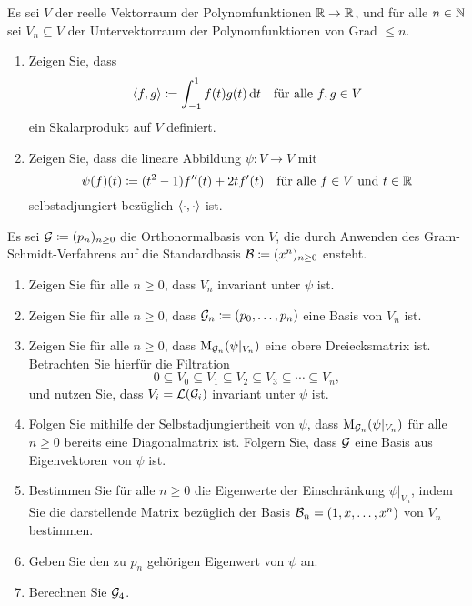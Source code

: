 \documentclass[a4paper,10pt]{scrartcl}
\begin{document}
\begin{question}
  Es sei $V$ der reelle Vektorraum der Polynomfunktionen $\mathbb{R} \to \mathbb{R}$, und für alle $n \in \mathbb{N}$ sei $V_n \subseteq V$ der Untervektorraum der Polynomfunktionen von Grad $\leq n$.
  \begin{enumerate}[leftmargin=*]
    \item
      
      Zeigen Sie, dass
      \[
                  \langle f, g \rangle
        \coloneqq \int_{-1}^1 f(t) g(t) \,\text{d}t
        \quad
        \text{für alle $f, g \in V$}
      \]
      ein Skalarprodukt auf $V$ definiert.
    \item
      Zeigen Sie, dass die lineare Abbildung $\psi \colon V \to V$ mit
      \[
        \psi(f)(t) \coloneqq (t^2 - 1) f''(t) + 2t f'(t)
        \quad
        \text{für alle $f \in V$ und $t \in \mathbb{R}$}
      \]
      selbstadjungiert bezüglich $\langle \cdot, \cdot \rangle$ ist.
  \end{enumerate}
  Es sei $\mathcal{G} \coloneqq (p_n)_{n \geq 0}$ die Orthonormalbasis von $V$, die durch Anwenden des Gram-Schmidt-Verfahrens auf die Standardbasis $\mathcal{B} \coloneqq (x^n)_{n \geq 0}$ ensteht.
  \begin{enumerate}[resume, leftmargin=*]
    \item
      Zeigen Sie für alle $n \geq 0$, dass $V_n$ invariant unter $\psi$ ist.
    \item
      Zeigen Sie für alle $n \geq 0$, dass $\mathcal{G}_n \coloneqq (p_0, \dotsc, p_n)$ eine Basis von $V_n$ ist.
    \item
      Zeigen Sie für alle $n \geq 0$, dass $\operatorname{M}_{\mathcal{G}_n}(\psi|_{V_n})$ eine obere Dreiecksmatrix ist.
      Betrachten Sie hierfür die Filtration
      \[
        0 \subseteq V_0 \subseteq V_1 \subseteq V_2 \subseteq V_3 \subseteq \dotsb \subseteq V_n,
      \]
      und nutzen Sie, dass $V_i = \operatorname{\mathcal{L}}(\mathcal{G}_i)$ invariant unter $\psi$ ist.
    \item
      Folgen Sie mithilfe der Selbstadjungiertheit von $\psi$, dass $\operatorname{M}_{\mathcal{G}_n}(\psi|_{V_n})$ für alle $n \geq 0$ bereits eine Diagonalmatrix ist.
      Folgern Sie, dass $\mathcal{G}$ eine Basis aus Eigenvektoren von $\psi$ ist.
    \item
      Bestimmen Sie für alle $n \geq 0$ die Eigenwerte der Einschränkung $\psi|_{V_n}$, indem Sie die darstellende Matrix bezüglich der Basis $\mathcal{B}_n = (1, x, \dotsc, x^n)$ von $V_n$ bestimmen.
    \item
      Geben Sie den zu $p_n$ gehörigen Eigenwert von $\psi$ an.
    \item
      Berechnen Sie $\mathcal{G}_4$.
  \end{enumerate}
\end{question}
\end{document}
